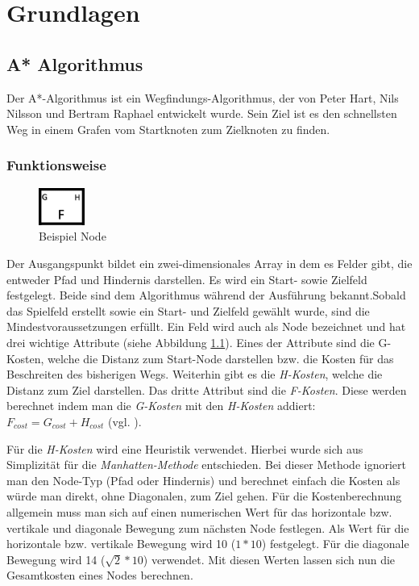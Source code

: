 \chapter{Grundlagen}
\label{sec:fundamentals}
\section{A* Algorithmus}
\label{sec:fundamentalsA*}
Der A*-Algorithmus ist ein Wegfindungs-Algorithmus, der von Peter Hart, Nils Nilsson und Bertram Raphael entwickelt wurde. Sein Ziel ist es den schnellsten Weg in einem Grafen vom Startknoten zum Zielknoten zu finden. 
\subsection{Funktionsweise}
\begin{figure}
    \includegraphics[width=1.5cm]{assets/aStarNode.png}
    \caption{Beispiel Node}
    \label{fig:aStarNode}
\end{figure}
Der Ausgangspunkt bildet ein zwei-dimensionales Array in dem es Felder gibt, die entweder Pfad und Hindernis darstellen. Es wird ein Start- sowie Zielfeld festgelegt. Beide sind dem Algorithmus während der Ausführung bekannt.Sobald das Spielfeld erstellt sowie ein Start- und Zielfeld gewählt wurde, sind die Mindestvoraussetzungen erfüllt. Ein Feld wird auch als Node bezeichnet und hat drei wichtige Attribute (siehe Abbildung \ref{fig:aStarNode}). Eines der Attribute sind die G-Kosten, welche die Distanz zum Start-Node darstellen bzw. die Kosten für das Beschreiten des bisherigen Wegs. Weiterhin gibt es die \textit{H-Kosten}, welche die Distanz zum Ziel darstellen. Das dritte Attribut sind die \textit{F-Kosten}. Diese werden berechnet indem man die \textit{G-Kosten} mit den \textit{H-Kosten} addiert: $F_{cost} = G_{cost} + H_{cost}$ (vgl. \cite{astar_comparison}).

Für die \textit{H-Kosten} wird eine Heuristik verwendet. Hierbei wurde sich aus Simplizität für die \textit{Manhatten-Methode} entschieden. Bei dieser Methode ignoriert man den Node-Typ (Pfad oder Hindernis) und berechnet einfach die Kosten als würde man direkt, ohne Diagonalen, zum Ziel gehen. Für die Kostenberechnung allgemein muss man sich auf einen numerischen Wert für das horizontale bzw. vertikale und diagonale Bewegung zum nächsten Node festlegen. Als Wert für die horizontale bzw. vertikale Bewegung wird 10 ($1*10$) festgelegt. Für die diagonale Bewegung wird 14 ($\sqrt{2}*10$) verwendet. Mit diesen Werten lassen sich nun die Gesamtkosten eines Nodes berechnen.

